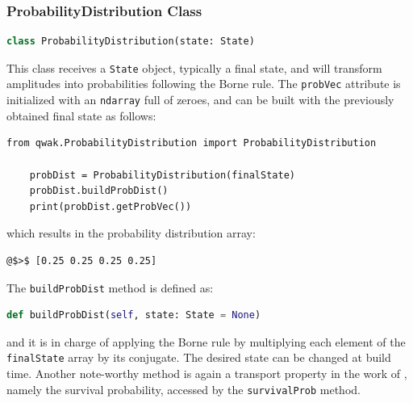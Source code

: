 \documentclass[../../dissertation.tex]{subfiles}
\begin{document}
\subsubsection{ProbabilityDistribution Class}
\begin{lstlisting}[style=commands,language=Python,mathescape]
    class ProbabilityDistribution(state: State)
\end{lstlisting}
This class receives a \texttt{State} object, typically a final state, and will
transform amplitudes into probabilities following the Borne rule. The
\texttt{probVec} attribute is initialized with an \texttt{ndarray} full of
zeroes, and can be built with the previously obtained final state as follows:
\begin{lstlisting}[style=code,escapeinside={__}]
    from qwak.ProbabilityDistribution import ProbabilityDistribution 

    probDist = ProbabilityDistribution(finalState)
    probDist.buildProbDist()
    print(probDist.getProbVec())
\end{lstlisting}
which results in the probability distribution array:
\begin{lstlisting}[style=commands,mathescape]
@$>$ [0.25 0.25 0.25 0.25]
\end{lstlisting}\par

The \texttt{buildProbDist} method is defined as:
\begin{lstlisting}[style=commands,mathescape,language=Python]
    def buildProbDist(self, state: State = None)
\end{lstlisting}
and it is in charge of applying the Borne rule by multiplying each element of
the \texttt{finalState} array by its conjugate. The desired state can be
changed at build time. Another note-worthy method is again a transport property
in the work of \cite{buarqueAperiodic19}, namely the survival probability,
accessed by the \texttt{survivalProb} method. 
\end{document}
